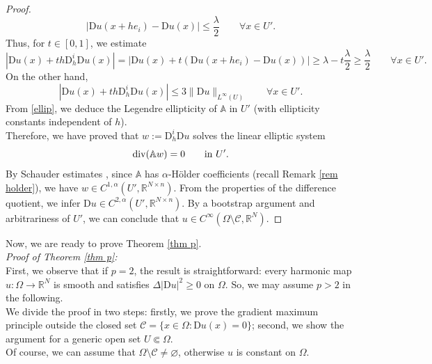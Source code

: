 \documentclass[a4paper,11pt]{article}
\numberwithin{equation}{section}
\newcommand{\numberset}{\mathbb}
\newcommand{\Om}{\Omega}
\newcommand{\R}{\numberset{R}}
\newcommand{\rom}{\mathrm}
\theoremstyle{definition}
\begin{document}
\begin{proof}
$$
|\rom Du(x+he_i)-\rom Du(x)|\leq\frac{\lambda}{2}\qquad\forall x\in U'.
$$
Thus, for $t\in[0,1]$, we estimate
$$
|\rom Du(x)+th\rom D_h^i\rom Du(x)|=|\rom Du(x)+t(\rom Du(x+he_i)-\rom Du(x))|\geq\lambda-t\frac{\lambda}2\geq\frac{\lambda}2\qquad\forall x\in U'.
$$
On the other hand, 
$$
|\rom Du(x)+th\rom D_h^i\rom Du(x)|\leq 3\|\rom Du\|_{L^\infty(U)}\qquad\forall x\in U'.
$$
From \eqref{ellip}, we deduce the Legendre ellipticity of $\mathbb A$ in $U'$ (with ellipticity constants independent of $h$).\\
Therefore, we have proved that $w:=\rom D_h^i \rom Du$ solves the linear elliptic system
$$
{\rm div}(\mathbb Aw)=0\qquad\mbox{in } U'.
$$
By Schauder estimates \cite[Thm. 5.19]{GM}, since $\mathbb A$ has $\alpha$-H\"older coefficients (recall Remark \ref{rem holder}), we have $w\in C^{1,\alpha}(U', \R^{N\times n})$. From the properties of the difference quotient, we infer $\rom D u\in C^{2,\alpha}(U',\R^{N\times n})$. By a bootstrap argument and arbitrariness of $U'$, we can conclude that $u\in C^\infty(\Om\setminus\mathscr C, \R^N)$.
\end{proof}

Now, we are ready to prove Theorem \ref{thm p}.\\

\textit{Proof of Theorem \ref{thm p}:}\\
First, we observe that if $p=2$, the result is straightforward: every harmonic map $u:\Om\to\R^N$ is smooth and satisfies $\Delta|\rom Du|^2\geq0$ on $\Om$.
So, we may assume $p>2$ in the following. \\
We divide the proof in two steps: firstly, we prove the gradient maximum principle outside the closed set $\mathscr{C}=\{x\in\Om:\mathrm Du(x)=0\}$; second, we show the argument for a generic open set $U\Subset\Om$.\\
Of course, we can assume that $\Om\setminus\mathscr C\neq \varnothing$, otherwise $u$ is constant on $\Om$.\\
\end{document}
